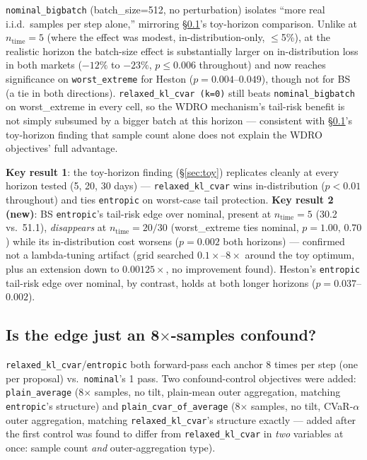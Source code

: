 \documentclass[11pt]{article}
\begin{document}
\texttt{nominal\_bigbatch} (batch\_size=512, no perturbation) isolates ``more real i.i.d.\
samples per step alone,'' mirroring \S\ref{sec:confound}'s toy-horizon comparison. Unlike at
$n_{\mathrm{time}}=5$ (where the effect was modest, in-distribution-only, $\le$5\%), at the
realistic horizon the batch-size effect is substantially larger on in-distribution loss in both
markets ($-12\%$ to $-23\%$, $p\le0.006$ throughout) and now reaches significance on
\texttt{worst\_extreme} for Heston ($p=0.004$--$0.049$), though not for BS (a tie in both
directions). \texttt{relaxed\_kl\_cvar (k=0)} still beats \texttt{nominal\_bigbatch} on
worst\_extreme in every cell, so the WDRO mechanism's tail-risk benefit is not simply subsumed by
a bigger batch at this horizon --- consistent with \S\ref{sec:confound}'s toy-horizon finding
that sample count alone does not explain the WDRO objectives' full advantage.

\textbf{Key result 1}: the toy-horizon finding (\S\ref{sec:toy}) replicates cleanly at every
horizon tested (5, 20, 30 days) --- \texttt{relaxed\_kl\_cvar} wins in-distribution ($p<0.01$
throughout) and ties \texttt{entropic} on worst-case tail protection.
\textbf{Key result 2 (new)}: BS \texttt{entropic}'s tail-risk edge over nominal, present at
$n_{\mathrm{time}}=5$ (30.2 vs.\ 51.1), \emph{disappears} at $n_{\mathrm{time}}=20/30$
(worst\_extreme ties nominal, $p=1.00,\,0.70$) while its in-distribution cost worsens
($p=0.002$ both horizons) --- confirmed not a lambda-tuning artifact (grid searched
$0.1\times$--$8\times$ around the toy optimum, plus an extension down to $0.00125\times$, no
improvement found). Heston's \texttt{entropic} tail-risk edge over nominal, by contrast, holds at
both longer horizons ($p=0.037$--$0.002$).

\subsection{Is the edge just an 8$\times$-samples confound?}
\label{sec:confound}

\texttt{relaxed\_kl\_cvar}/\texttt{entropic} both forward-pass each anchor 8 times per step
(one per proposal) vs.\ \texttt{nominal}'s 1 pass. Two confound-control objectives were added:
\texttt{plain\_average} (8$\times$ samples, no tilt, plain-mean outer aggregation, matching
\texttt{entropic}'s structure) and \texttt{plain\_cvar\_of\_average} (8$\times$ samples, no tilt,
CVaR-$\alpha$ outer aggregation, matching \texttt{relaxed\_kl\_cvar}'s structure exactly ---
added after the first control was found to differ from \texttt{relaxed\_kl\_cvar} in \emph{two}
variables at once: sample count \emph{and} outer-aggregation type).
\end{document}
